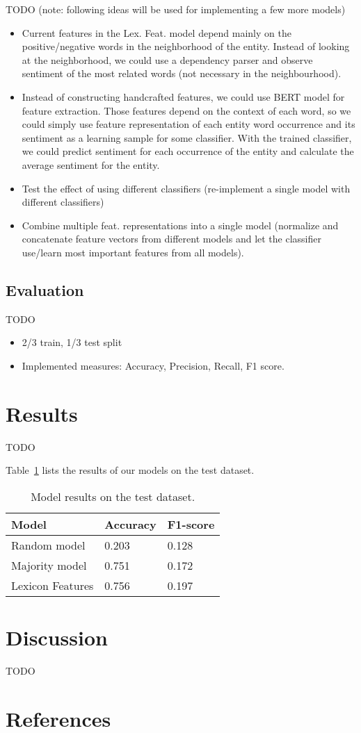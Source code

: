 \documentclass[11pt,a4paper]{article}
\begin{document}
TODO (note: following ideas will be used for implementing a few more models)
\begin{itemize}
    \item Current features in the Lex. Feat. model depend mainly on the positive/negative words in the neighborhood of the entity. Instead of looking at the neighborhood, we could use a dependency parser and observe sentiment of the most related words (not necessary in the neighbourhood).
    \item Instead of constructing handcrafted features, we could use BERT model for feature extraction. Those features depend on the context of each word, so we could simply use feature representation of each entity word occurrence and its sentiment as a learning sample for some classifier. With the trained classifier, we could predict sentiment for each occurrence of the entity and calculate the average sentiment for the entity.
    \item Test the effect of using different classifiers (re-implement a single model with different classifiers)
    \item Combine multiple feat. representations into a single model (normalize and concatenate feature vectors from different models and let the classifier use/learn most important features from all models).
\end{itemize}

\subsection{Evaluation}

TODO
\begin{itemize}
    \item 2/3 train, 1/3 test split
    \item Implemented measures: Accuracy, Precision, Recall, F1 score.
\end{itemize}



\section{Results}

TODO

Table~\ref{tab:results} lists the results of our models on the test dataset.

\begin{table}[h]
\centering
\begin{tabular}{lll}
Model            & Accuracy & F1-score \\ \hline
Random model     & 0.203    & 0.128    \\
Majority model   & 0.751    & 0.172    \\
Lexicon Features & 0.756    & 0.197   
\end{tabular}
\caption{Model results on the test dataset.}
\label{tab:results}
\end{table}


\section{Discussion}

TODO



\section{References}



\end{document}
